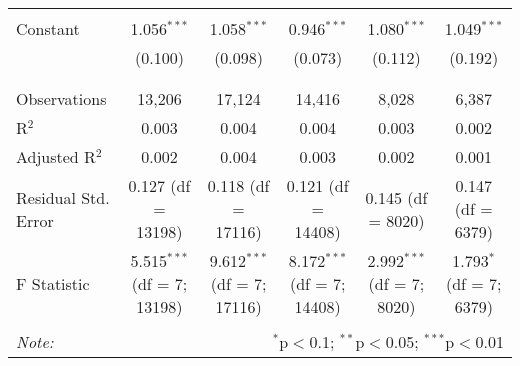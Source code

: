 \begin{table}[!htbp]
\begin{adjustbox}{width=\textwidth}
\begin{tabular}{@{\extracolsep{5pt}}lccccc}
  & & & & & \\ 
 Constant & 1.056$^{***}$ & 1.058$^{***}$ & 0.946$^{***}$ & 1.080$^{***}$ & 1.049$^{***}$ \\ 
  & (0.100) & (0.098) & (0.073) & (0.112) & (0.192) \\ 
  & & & & & \\ 
\hline \\[-1.8ex] 
Observations & 13,206 & 17,124 & 14,416 & 8,028 & 6,387 \\ 
R$^{2}$ & 0.003 & 0.004 & 0.004 & 0.003 & 0.002 \\ 
Adjusted R$^{2}$ & 0.002 & 0.004 & 0.003 & 0.002 & 0.001 \\ 
Residual Std. Error & 0.127 (df = 13198) & 0.118 (df = 17116) & 0.121 (df = 14408) & 0.145 (df = 8020) & 0.147 (df = 6379) \\ 
F Statistic & 5.515$^{***}$ (df = 7; 13198) & 9.612$^{***}$ (df = 7; 17116) & 8.172$^{***}$ (df = 7; 14408) & 2.992$^{***}$ (df = 7; 8020) & 1.793$^{*}$ (df = 7; 6379) \\ 
\hline 
\hline \\[-1.8ex] 
\textit{Note:}  & \multicolumn{5}{r}{$^{*}$p$<$0.1; $^{**}$p$<$0.05; $^{***}$p$<$0.01} \\ 
\end{tabular} 
\end{adjustbox}
\end{table} 
